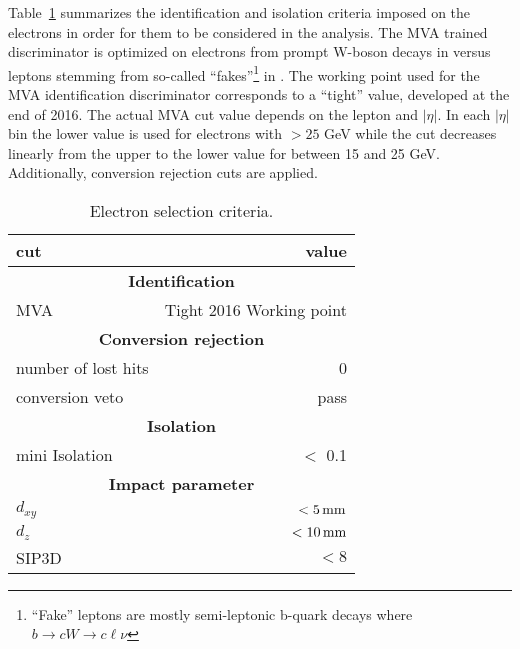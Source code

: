 Table~\ref{tab:electrons} summarizes the identification and isolation criteria imposed on the electrons in order for them to be considered in the analysis. 
The MVA trained discriminator is optimized on electrons from prompt W-boson decays in \ttbar versus leptons stemming from so-called ``fakes''\footnote{``Fake'' leptons are mostly semi-leptonic b-quark decays where $b \rightarrow cW \rightarrow c\ell \nu$} in \ttbar. 
The working point used for the MVA identification discriminator corresponds to a ``tight'' value, developed at the end of 2016. 
The actual MVA cut value depends on the lepton \pt and $|\eta|$. 
In each $|\eta|$ bin the lower value is used for electrons with \pt $> 25$ GeV while the cut decreases linearly from the upper to the lower value for \pt between 15 and 25 GeV. 
Additionally, conversion rejection cuts are applied.                        

\begin{table}[ht!]
\def\arraystretch{1.2}
    \caption{Electron selection criteria.}
    \label{tab:electrons}
    \begin{center}
        \begin{tabular}{ l r}
        \hline \hline
        cut &  value                             \\ \hline
        \multicolumn{2}{c}{\textbf{Identification}}                \\
        MVA &  Tight 2016 Working point    \\
        \multicolumn{2}{c}{\textbf{Conversion rejection}}                \\
        number of lost hits & 0 \\
        conversion veto & pass \\                          
        \multicolumn{2}{c}{\textbf{Isolation}}                \\
        mini Isolation  &  $<$ 0.1                         \\
        \multicolumn{2}{c}{\textbf{Impact parameter}}                \\
        $d_{xy}$ & $<5\,\text{mm}$ \\
        $d_{z}$ & $<10\,\text{mm}$ \\
        SIP3D    & $< 8$ \\
\hline\hline
\end{tabular}
\end{center}
\end{table}                                                                                       

